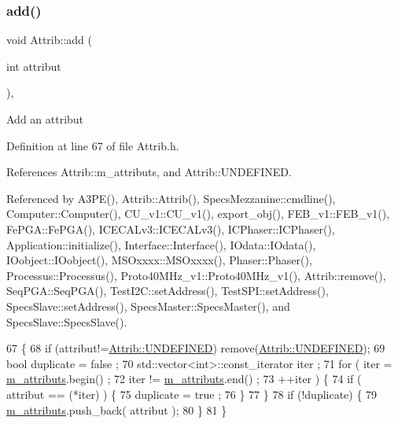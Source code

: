 \subsubsection{\texorpdfstring{add()}{add()}}
{\footnotesize\ttfamily void Attrib\+::add (\begin{DoxyParamCaption}\item[{int}]{attribut }\end{DoxyParamCaption})\hspace{0.3cm}{\ttfamily [inline]}, {\ttfamily [inherited]}}

Add an attribut 

Definition at line 67 of file Attrib.\+h.



References Attrib\+::m\+\_\+attributs, and Attrib\+::\+U\+N\+D\+E\+F\+I\+N\+ED.



Referenced by A3\+P\+E(), Attrib\+::\+Attrib(), Specs\+Mezzanine\+::cmdline(), Computer\+::\+Computer(), C\+U\+\_\+v1\+::\+C\+U\+\_\+v1(), export\+\_\+obj(), F\+E\+B\+\_\+v1\+::\+F\+E\+B\+\_\+v1(), Fe\+P\+G\+A\+::\+Fe\+P\+G\+A(), I\+C\+E\+C\+A\+Lv3\+::\+I\+C\+E\+C\+A\+Lv3(), I\+C\+Phaser\+::\+I\+C\+Phaser(), Application\+::initialize(), Interface\+::\+Interface(), I\+Odata\+::\+I\+Odata(), I\+Oobject\+::\+I\+Oobject(), M\+S\+Oxxxx\+::\+M\+S\+Oxxxx(), Phaser\+::\+Phaser(), Processus\+::\+Processus(), Proto40\+M\+Hz\+\_\+v1\+::\+Proto40\+M\+Hz\+\_\+v1(), Attrib\+::remove(), Seq\+P\+G\+A\+::\+Seq\+P\+G\+A(), Test\+I2\+C\+::set\+Address(), Test\+S\+P\+I\+::set\+Address(), Specs\+Slave\+::set\+Address(), Specs\+Master\+::\+Specs\+Master(), and Specs\+Slave\+::\+Specs\+Slave().


\begin{DoxyCode}
67                             \{
68     \textcolor{keywordflow}{if} (attribut!=\hyperlink{classAttrib_a69e171d7cc6417835a5a306d3c764235a3a8da2ab97dda18aebab196fe4100531}{Attrib::UNDEFINED}) \textcolor{keyword}{remove}(\hyperlink{classAttrib_a69e171d7cc6417835a5a306d3c764235a3a8da2ab97dda18aebab196fe4100531}{Attrib::UNDEFINED});
69     \textcolor{keywordtype}{bool} duplicate = false ;
70     std::vector<int>::const\_iterator iter ;
71     \textcolor{keywordflow}{for} ( iter  = \hyperlink{classAttrib_ac4bd58a0cc6b38a3b711d609a3d3aacc}{m\_attributs}.begin() ;
72           iter != \hyperlink{classAttrib_ac4bd58a0cc6b38a3b711d609a3d3aacc}{m\_attributs}.end()   ;
73           ++iter ) \{
74       \textcolor{keywordflow}{if} ( attribut == (*iter) ) \{
75         duplicate = true ;
76       \}
77     \}
78     \textcolor{keywordflow}{if} (!duplicate) \{
79       \hyperlink{classAttrib_ac4bd58a0cc6b38a3b711d609a3d3aacc}{m\_attributs}.push\_back( attribut );
80     \}
81   \}
\end{DoxyCode}
\mbox{\label{classHierarchy_ad677774ff38fcb257c04a3a10d471fac}} 
